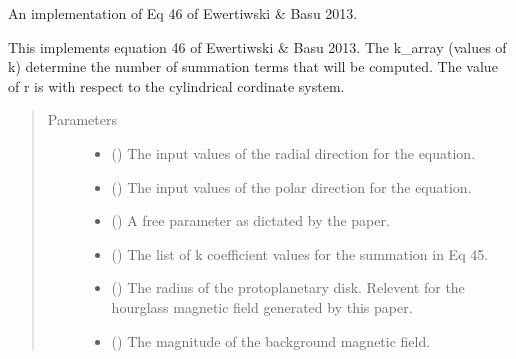 \documentclass[letterpaper,10pt,english]{sphinxmanual}
\begin{document}

\begin{fulllineitems}
\label{\detokenize{Backend.Ewertowski_Basu_2013:Backend.Ewertowski_Basu_2013.Ewer_Basu__B_z}}
An implementation of Eq 46 of Ewertiwski \& Basu 2013.

This implements equation 46 of Ewertiwski \& Basu 2013. The k\_array (values
of k) determine the number of summation terms that will be computed. The
value of r is with respect to the cylindrical cordinate system.
\begin{quote}\begin{description}
\item[{Parameters}] \leavevmode\begin{itemize}
\item {} 
 () \textendash{} The input values of the radial direction for the equation.

\item {} 
 () \textendash{} The input values of the polar direction for the equation.

\item {} 
 () \textendash{} A free parameter as dictated by the paper.

\item {} 
 () \textendash{} The list of k coefficient values for the summation in Eq 45.

\item {} 
 () \textendash{} The radius of the protoplanetary disk. Relevent for the hourglass
magnetic field generated by this paper.

\item {} 
 () \textendash{} The magnitude of the background magnetic field.


\end{itemize}
\end{description}
\end{quote}
\end{fulllineitems}
\end{document}
